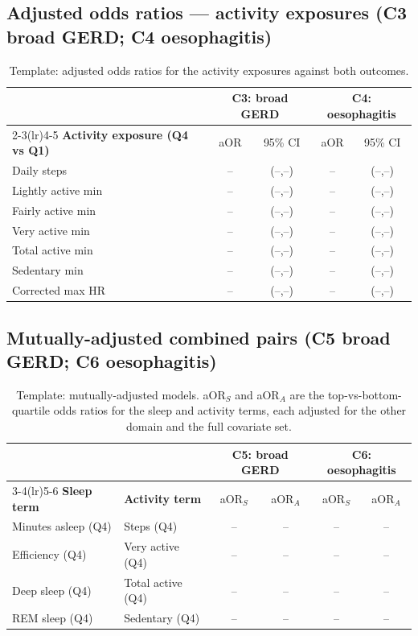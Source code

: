 \documentclass[11pt]{article}
\begin{document}
\subsection{Adjusted odds ratios --- activity exposures (C3 broad GERD; C4 oesophagitis)}
\begin{table}[h]
\centering
\footnotesize
\begin{tabular}{@{}l cc cc@{}}
\toprule
& \multicolumn{2}{c}{\textbf{C3: broad GERD}} & \multicolumn{2}{c}{\textbf{C4: oesophagitis}} \\
\cmidrule(lr){2-3}\cmidrule(lr){4-5}
\textbf{Activity exposure (Q4 vs Q1)} & aOR & 95\% CI & aOR & 95\% CI \\
\midrule
Daily steps            & -- & (--,--) & -- & (--,--) \\
Lightly active min     & -- & (--,--) & -- & (--,--) \\
Fairly active min      & -- & (--,--) & -- & (--,--) \\
Very active min        & -- & (--,--) & -- & (--,--) \\
Total active min       & -- & (--,--) & -- & (--,--) \\
Sedentary min          & -- & (--,--) & -- & (--,--) \\
Corrected max HR       & -- & (--,--) & -- & (--,--) \\
\bottomrule
\end{tabular}
\caption{Template: adjusted odds ratios for the activity exposures against both outcomes.}
\end{table}

\subsection{Mutually-adjusted combined pairs (C5 broad GERD; C6 oesophagitis)}
\begin{table}[h]
\centering
\footnotesize
\begin{tabular}{@{}l l cc cc@{}}
\toprule
& & \multicolumn{2}{c}{\textbf{C5: broad GERD}} & \multicolumn{2}{c}{\textbf{C6: oesophagitis}} \\
\cmidrule(lr){3-4}\cmidrule(lr){5-6}
\textbf{Sleep term} & \textbf{Activity term} & aOR$_S$ & aOR$_A$ & aOR$_S$ & aOR$_A$ \\
\midrule
Minutes asleep (Q4) & Steps (Q4)        & -- & -- & -- & -- \\
Efficiency (Q4)     & Very active (Q4)  & -- & -- & -- & -- \\
Deep sleep (Q4)     & Total active (Q4) & -- & -- & -- & -- \\
REM sleep (Q4)      & Sedentary (Q4)    & -- & -- & -- & -- \\
\bottomrule
\end{tabular}
\caption{Template: mutually-adjusted models. aOR$_S$ and aOR$_A$ are the top-vs-bottom-quartile odds
ratios for the sleep and activity terms, each adjusted for the other domain and the full covariate set.}
\end{table}
\end{document}
